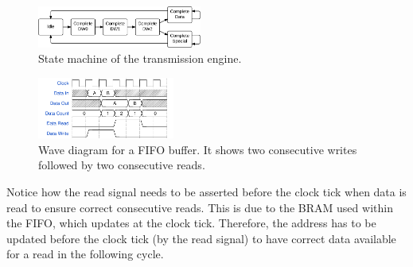 
\begin{figure}[!ht]
    \centering
    \includegraphics[width=0.48\textwidth]{figures/statemachine-transmit}
    \caption{State machine of the transmission engine.}
    \label{fig:statemachine-transmit}
\end{figure}


\begin{figure}[!ht]
    \centering
    \includegraphics[width=0.40\textwidth]{figures/wavediagram-fifo}
    \caption{Wave diagram for a FIFO buffer. It shows two consecutive writes followed by two consecutive reads.}
    \label{fig:wavediagram-fifo}
\end{figure}

Notice how the read signal needs to be asserted before the clock tick when data is read to ensure correct consecutive reads.
This is due to the BRAM used within the FIFO, which updates at the clock tick.
Therefore, the address has to be updated before the clock tick (by the read signal) to have correct data available for a read in the following cycle.

